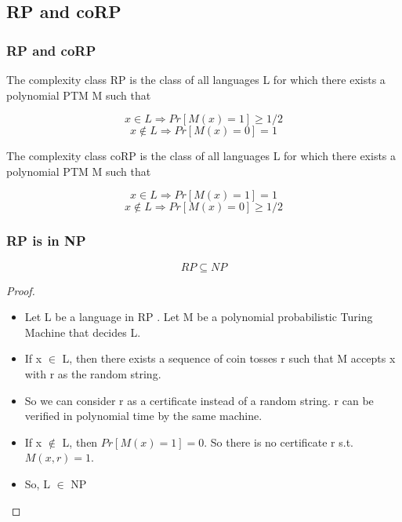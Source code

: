 \documentclass{beamer}
\begin{document}
\subsection{RP and coRP}
\begin{frame}
\frametitle{RP and coRP}
	\begin{definition}[RP]
		The complexity class RP is the class of all languages L for which there exists a polynomial PTM M such that

		$$
		x \in L \Rightarrow Pr[M(x) = 1] \geq 1/2
		$$
		$$
		x \notin L \Rightarrow Pr[M(x) = 0] = 1
		$$
	\end{definition}
	\begin{definition}[coRP]
		The complexity class coRP is the class of all languages L for which there exists a polynomial PTM M such that

		$$
		x \in L \Rightarrow Pr[M(x) = 1] = 1
		$$
		$$
		x \notin L \Rightarrow Pr[M(x) = 0] \geq 1/2
		$$
	\end{definition}
\end{frame}
\begin{frame}
\frametitle{RP is in NP}
\begin{theorem}
	$$RP \subseteq NP$$
\end{theorem}
\begin{proof}
	\begin{itemize}
		\item Let L be a language in RP . Let M be a polynomial probabilistic Turing Machine that decides L.
		\item If x $\in$ L, then there exists a sequence of coin tosses r such that M accepts x with r as the random string.

		\item So we can consider r as a certificate instead of a random string. r can be verified in polynomial time by the same machine.
		\item If x $\notin$ L, then $Pr[M(x) = 1] = 0$. So there is no certificate r s.t. $M(x, r) = 1$.
		\item So, L $\in$ NP
	\end{itemize}
\end{proof}
\end{frame}
\end{document}
